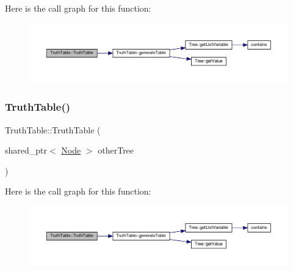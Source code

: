 Here is the call graph for this function\+:\nopagebreak
\begin{figure}[H]
\begin{center}
\leavevmode
\includegraphics[width=350pt]{dc/d49/class_truth_table_abab023791b3a72496ff56434fc0e02b4_cgraph}
\end{center}
\end{figure}
\mbox{\label{class_truth_table_afe78a848779c34a2c0eb23ecf1e6db6f}} 
\subsubsection{\texorpdfstring{Truth\+Table()}{TruthTable()}\hspace{0.1cm}{\footnotesize\ttfamily [3/3]}}
{\footnotesize\ttfamily Truth\+Table\+::\+Truth\+Table (\begin{DoxyParamCaption}\item[{shared\+\_\+ptr$<$ \hyperlink{class_node}{Node} $>$}]{other\+Tree }\end{DoxyParamCaption})\hspace{0.3cm}{\ttfamily [explicit]}}

Here is the call graph for this function\+:\nopagebreak
\begin{figure}[H]
\begin{center}
\leavevmode
\includegraphics[width=350pt]{dc/d49/class_truth_table_afe78a848779c34a2c0eb23ecf1e6db6f_cgraph}
\end{center}
\end{figure}
\mbox{\label{class_truth_table_a1574928e406cb242a4f1abb6bc2924f3}} 
